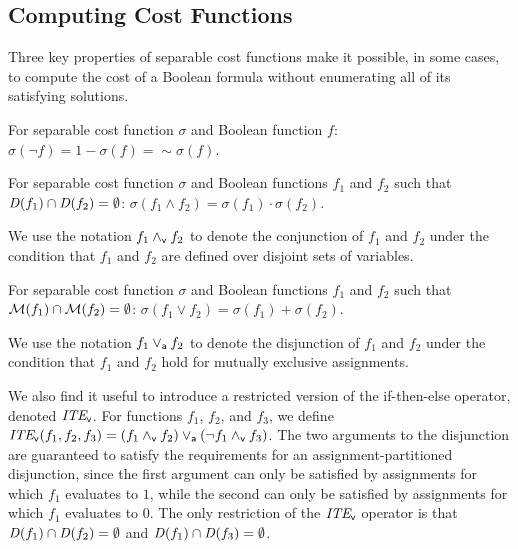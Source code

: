 \documentclass{llncs}
\newcommand{\pand}{\mathbin{\land_{\sf v}}}
\newcommand{\por}{\mathbin{\lor_{\sf a}}}
\newcommand{\tautology}{1}
\newcommand{\nil}{0}
\newcommand{\pite}{\mbox{\it ITE}_{\sf v}}
\newcommand{\oneminus}{{\sim}}
\newcommand{\interpset}[1]{{\cal M}(#1)}
\newcommand{\cost}{\sigma}
\newcommand{\depend}{{\it D}}
\begin{document}
\subsection{Computing Cost Functions}

Three key properties of separable cost functions make it possible, in
some cases, to compute the cost of a Boolean formula without
enumerating all of its satisfying solutions.


\begin{proposition}[Complementation]
\label{prop:complementation}
  For separable cost function $\cost$ and Boolean function $f$:
  $\cost(\neg f) = 1 - \cost(f) = \oneminus \cost(f)$.
\end{proposition}

\begin{proposition}
\label{prop:conjunction}
  For separable cost function $\cost$ and Boolean functions $f_1$ and $f_2$ such that $\depend(f_1) \cap \depend(f_2) = \emptyset$:
    $\cost(f_1 \land f_2) = \cost(f_1) \cdot \cost(f_2)$.
\end{proposition}
We use the notation $f_1 \pand f_2$ to denote the conjunction of $f_1$ and
$f_2$ under the condition that $f_1$ and $f_2$ are defined over
disjoint sets of variables.

\begin{proposition}
\label{prop:disjunction}
  For separable cost function $\cost$ and Boolean functions $f_1$ and $f_2$ such that $\interpset{f_1} \cap \interpset{f_2} = \emptyset$:
    $\cost(f_1 \lor f_2) = \cost(f_1) + \cost(f_2)$.
\end{proposition}
We use the notation $f_1 \por f_2$ to denote the disjunction of $f_1$ and $f_2$ under the
condition that $f_1$ and $f_2$ hold for mutually exclusive assignments.

We also find it useful to introduce a restricted version of the
if-then-else operator, denoted $\pite$.  For functions $f_1$,
$f_2$, and $f_3$, we define $\pite(f_1, f_2, f_3) = (f_1 \pand f_2)
\por (\neg f_1 \pand f_3)$.  The two arguments to the disjunction are
guaranteed to satisfy the requirements for an assignment-partitioned
disjunction, since the first argument can only be satisfied by assignments
for which $f_1$ evaluates to $\tautology$, while the second can only
be satisfied by assignments for which $f_1$ evaluates to $\nil$.  The
only restriction of the $\pite$ operator is that
$\depend(f_1) \cap \depend(f_2) = \emptyset$ and
$\depend(f_1) \cap \depend(f_3) = \emptyset$.
\end{document}
